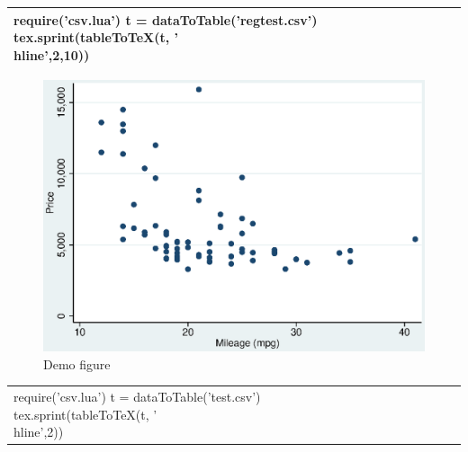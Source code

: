 \documentclass[a4paper]{article}
\begin{document}
\begin{table}
\centering
\begin{tabular}{lrrrrrrr}
  \hline
  \hline
  \luaexec{
    require('csv.lua')
    t = dataToTable('regtest.csv')
    tex.sprint(tableToTeX(t, '\\hline',{2,10}))
    } \\
  \hline
  \hline
  \end{tabular}
\end{table}

\begin{figure}
\centering
\includegraphics[width=1\textwidth]{figure.eps}
\caption{\label{fig:figure}Demo figure}
\end{figure}

\begin{table}
\centering
\begin{tabular}{l|rrrrrrr}
  \luaexec{
    require('csv.lua')
    t = dataToTable('test.csv')
    tex.sprint(tableToTeX(t, '\\hline',{2}))
    } \\
  \end{tabular}
\end{table}
\end{document}
